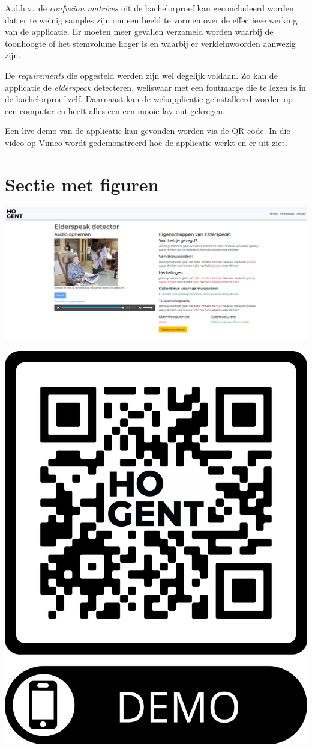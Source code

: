 \documentclass[a0,portrait]{a0poster}
\begin{document}
\begin{multicols}{2}
A.d.h.v.\ de \textit{confusion matrices} uit de bachelorproef kan geconcludeerd worden dat er te weinig samples zijn om een beeld te vormen over de effectieve werking van de applicatie. Er moeten meer gevallen verzameld worden waarbij de toonhoogte of het stemvolume hoger is en waarbij er verkleinwoorden aanwezig zijn.

De \textit{requirements} die opgesteld werden zijn wel degelijk voldaan. Zo kan de applicatie de \textit{elderspeak} detecteren, weliswaar met een foutmarge die te lezen is in de bachelorproef zelf. Daarnaast kan de webapplicatie geïnstalleerd worden op een computer en heeft alles een een mooie lay-out gekregen.

Een live-demo van de applicatie kan gevonden worden via de QR-code. In die video op Vimeo wordt gedemonstreerd hoe de applicatie werkt en er uit ziet.

\color{HoGentAccent1}
\section*{Sectie met figuren}
\color{black}

\begin{center}\vspace{1cm}
    \includegraphics[width=1.0\linewidth]{dector_na_detecteren}
\end{center}\vspace{1cm}

\begin{center}\vspace{1cm}
    \includegraphics[width=0.25\linewidth]{qr}
\end{center}\vspace{1cm}



\end{multicols}
\end{document}
